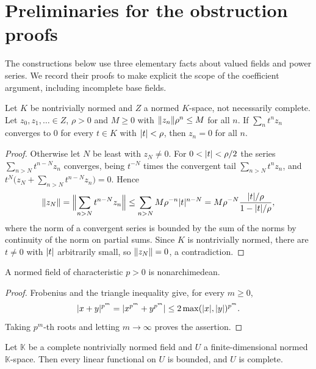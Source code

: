 \section{Preliminaries for the obstruction proofs}\label{app:obstruction-preliminaries}
The constructions below use three elementary facts about valued fields and power series. We record their proofs to make explicit the scope of the coefficient argument, including incomplete base fields.

\begin{lemma}\label{lem:unique}
Let $K$ be nontrivially normed and $Z$ a normed $K$\nobreakdash-space, not necessarily complete. Let $z_0,z_1,\ldots\in Z$, $\rho>0$
and $M\ge0$ with $\lVert z_n\rVert\rho^n\le M$ for all $n$. If $\sum_nt^nz_n$ converges to $0$ for every $t\in K$ with
$\lvert t\rvert<\rho$, then $z_n=0$ for all $n$.
\end{lemma}

\begin{proof}
Otherwise let $N$ be least with $z_N\neq0$. For $0<\lvert t\rvert<\rho/2$ the series $\sum_{n>N}t^{n-N}z_n$ converges, being
$t^{-N}$ times the convergent tail $\sum_{n>N}t^nz_n$, and $t^N\bigl(z_N+\sum_{n>N}t^{n-N}z_n\bigr)=0$. Hence
\[
\lVert z_N\rVert=\Bigl\lVert\sum_{n>N}t^{n-N}z_n\Bigr\rVert\le\sum_{n>N}M\rho^{-n}\lvert t\rvert^{n-N}
=M\rho^{-N}\frac{\lvert t\rvert/\rho}{1-\lvert t\rvert/\rho},
\]
where the norm of a convergent series is bounded by the sum of the norms by continuity of the norm on partial sums.
Since $K$ is nontrivially normed, there are $t\ne0$ with $\lvert t\rvert$ arbitrarily small, so $\lVert z_N\rVert=0$, a
contradiction.
\end{proof}

\begin{lemma}\label{lem:ultra}
A normed field of characteristic $p>0$ is nonarchimedean.
\end{lemma}

\begin{proof}
Frobenius and the triangle inequality give, for every $m\ge0$,
\[
 \lvert x+y\rvert^{p^m}=\lvert x^{p^m}+y^{p^m}\rvert
 \le2\max(\lvert x\rvert,\lvert y\rvert)^{p^m}.
\]
Taking $p^m$\nobreakdash-th roots and letting $m\to\infty$ proves the assertion.
\end{proof}

\begin{lemma}\label{lem:findim}
Let $\mathbb K$ be a complete nontrivially normed field and $U$ a finite-dimensional normed $\mathbb K$\nobreakdash-space. Then every
linear functional on $U$ is bounded, and $U$ is complete.
\end{lemma}

